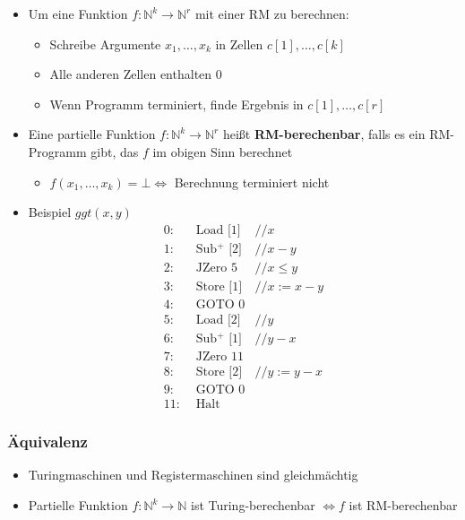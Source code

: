 \documentclass{scrartcl}
\begin{document}
\begin{itemize}
	\item Um eine Funktion $f: \mathbb{N}^k \rightarrow \mathbb{N}^r$ mit einer RM zu berechnen:
	\begin{itemize}
		\item Schreibe Argumente $x_1,\ldots,x_k$ in Zellen $c[1],\ldots,c[k]$
		\item Alle anderen Zellen enthalten 0
		\item Wenn Programm terminiert, finde Ergebnis in $c[1],\ldots,c[r]$
	\end{itemize}
	\item Eine partielle Funktion $f: \mathbb{N}^k \rightarrow \mathbb{N}^r$ heißt \textbf{RM-berechenbar}, falls es ein RM-Programm gibt, das $f$ im obigen Sinn berechnet
	\begin{itemize}
		\item $f(x_1,\ldots,x_k) = \bot \iff$ Berechnung terminiert nicht
	\end{itemize}
	\item Beispiel $ggt(x,y)$
	\begin{align*}
		0: & \text{ Load [1]} & //x \\
		1: & \text{ Sub$^+$ [2]} & //x-y \\
		2: & \text{ JZero 5} & //x \leq y \\
		3: & \text{ Store [1]} & //x := x-y \\
		4: & \text{ GOTO 0} \\
		5: & \text{ Load [2]} & //y \\
		6: & \text{ Sub$^+$ [1]} & //y-x \\
		7: & \text{ JZero 11} \\
		8: & \text{ Store [2]} & //y := y-x \\
		9: & \text{ GOTO 0} \\
		11: & \text{ Halt}
	\end{align*}
\end{itemize}

\subsubsection{Äquivalenz}

\begin{itemize}
	\item Turingmaschinen und Registermaschinen sind gleichmächtig
	\item Partielle Funktion $f: \mathbb{N}^k \rightarrow \mathbb{N}$ ist Turing-berechenbar $\iff f$ ist RM-berechenbar
\end{itemize}
\end{document}
